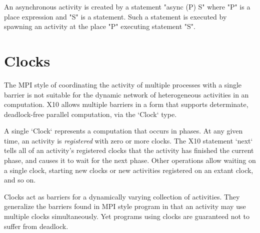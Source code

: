 An asynchronous activity is created by a statement \xcd"async (P) S"
where \xcd"P" is a place expression and \xcd"S" is a statement.  Such
a statement is executed by spawning an activity at the place
\xcd"P"  executing statement \xcd"S".




\section{Clocks}
The MPI style of coordinating the activity of multiple processes with
a single barrier is not suitable for the dynamic network of heterogeneous
activities in an \Xten{} computation.  
X10 allows multiple barriers in a form that supports determinate,
deadlock-free parallel computation, via the \xcd`Clock` type.

A single \xcd`Clock` represents a computation that occurs in phases.
At any given time, an activity is {\em registered} with zero or more clocks.
The X10 statement \xcd`next` tells all of an activity's registered clocks that
the activity has finished the current phase, and causes it to wait for the
next phase.  Other operations allow waiting on a single clock, starting
new clocks or new activities registered on an extant clock, and so on. 


Clocks act as {barriers} for a dynamically varying collection of activities.
They generalize the barriers found in MPI style program in that an activity
may use multiple clocks simultaneously. Yet programs using clocks are
guaranteed not to suffer from deadlock.

